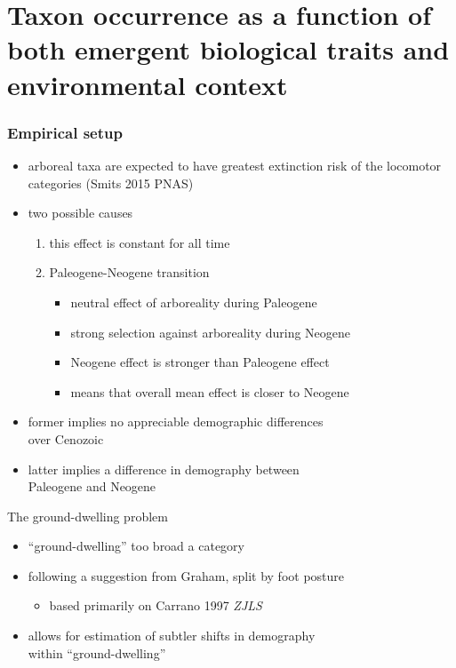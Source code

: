 \documentclass{beamer}
\begin{document}
\begin{frame}
\end{frame}


\section{Taxon occurrence as a function of both emergent biological traits and environmental context}

\begin{frame}
  \frametitle{Empirical setup}
  \begin{itemize}
    \item arboreal taxa are expected to have greatest extinction risk of the locomotor categories (Smits 2015 PNAS)
    \item two possible causes
      \begin{enumerate}
        \item this effect is constant for all time
        \item Paleogene-Neogene transition
          \begin{itemize}
            \item neutral effect of arboreality during Paleogene
            \item strong selection against arboreality during Neogene
            \item Neogene effect is stronger than Paleogene effect
            \item means that overall mean effect is closer to Neogene
          \end{itemize}
      \end{enumerate}
    \item former implies no appreciable demographic differences \\over Cenozoic
    \item latter implies a difference in demography between \\Paleogene and Neogene
  \end{itemize}
\end{frame}

\begin{frame}
  \begin{block}{The ground-dwelling problem}
    \begin{itemize}
      \item ``ground-dwelling'' too broad a category
      \item following a suggestion from Graham, split by foot posture
        \begin{itemize}
          \item based primarily on Carrano 1997 \textit{ZJLS}
        \end{itemize}
      \item allows for estimation of subtler shifts in demography \\within ``ground-dwelling''
    \end{itemize}
  \end{block}
\end{frame}
\end{document}
